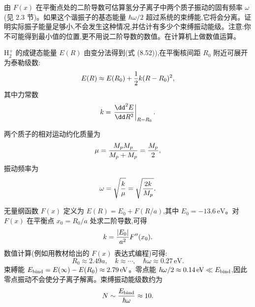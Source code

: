 \begin{question}
由 $F(x)$ 在平衡点处的二阶导数可估算氢分子离子中两个质子振动的固有频率 $\omega$(见 2.3 节)。如果这个谐振子的基态能量 $\hbar\omega/2$ 超过系统的束缚能,它将会分离。证明实际振子能量足够小,不会发生这种情况,并估计有多少个束缚振动能级。注意:你不可能得到最小值的位置,更不用说二阶导数的数值。在计算机上做数值运算。
\end{question}
\begin{solution}
$\mathrm H_2^+$ 的成键态能量 $E(R)$ 由变分法得到(式 (8.52)),在平衡核间距 $R_0$ 附近可展开为泰勒级数:
\[
E(R)\approx E(R_0)+{1\over2}k(R-R_0)^2,
\]
其中力常数
\[
k=\left.{\dd^2E\over\dd R^2}\right|_{R=R_0}.
\]

两个质子的相对运动约化质量为
\[
\mu={M_pM_p\over M_p+M_p}={M_p\over2},
\]
振动频率为
\[
\omega=\sqrt{k\over\mu}=\sqrt{2k\over M_p}.
\]

无量纲函数 $F(x)$ 定义为 $E(R)=E_0+F(R/a)$,其中 $E_0=-13.6\,\mathrm{eV}$。对 $F(x)$ 在平衡点 $x_0=R_0/a$ 处求二阶导数,可得
\[
k={|E_0|\over a^2}F''(x_0).
\]
数值计算(例如用教材给出的 $F(x)$ 表达式编程)可得:
\[
R_0\approx2.49a,\quad k\approx\cdots,\quad
\hbar\omega\approx0.27\,\mathrm{eV}.
\]
束縛能 $E_{\rm bind}=E(\infty)-E(R_0)\approx2.79\,\mathrm{eV}$。零点能 $\hbar\omega/2\approx0.14\,\mathrm{eV}\ll E_{\rm bind}$,因此零点振动不会使分子离子解离。束缚振动能级数约为
\[
N\sim{E_{\rm bind}\over\hbar\omega}\approx10.
\]
\end{solution}


